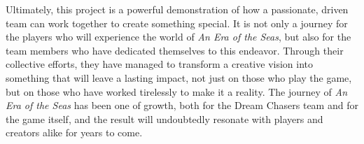 \documentclass{article}
\begin{document}
Ultimately, this project is a powerful demonstration of how a passionate, driven team can work together to create something special. It is not only a journey for the players who will experience the world of \textit{An Era of the Seas}, but also for the team members who have dedicated themselves to this endeavor. Through their collective efforts, they have managed to transform a creative vision into something that will leave a lasting impact, not just on those who play the game, but on those who have worked tirelessly to make it a reality. The journey of \textit{An Era of the Seas} has been one of growth, both for the Dream Chasers team and for the game itself, and the result will undoubtedly resonate with players and creators alike for years to come.
\end{document}
